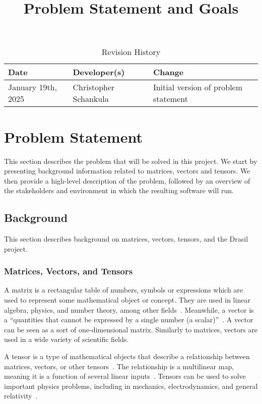 \documentclass{article}
\title{Problem Statement and Goals\\\progname}
\author{\authname}
\date{}
\begin{document}
\maketitle

\begin{table}[hp]
\caption{Revision History} \label{TblRevisionHistory}
\begin{tabularx}{\textwidth}{llX}
\toprule
\textbf{Date} & \textbf{Developer(s)} & \textbf{Change}\\
\midrule
January 19th, 2025 & Christopher Schankula & Initial version of problem statement\\
\bottomrule
\end{tabularx}
\end{table}

\section{Problem Statement}

This section describes the problem that will be solved in this project. We start by
presenting background information related to matrices, vectors and tensors. We then
provide a high-level description of the problem, followed by an overview of the
stakeholders and environment in which the resulting software will run.

\subsection{Background}

This section describes background on matrices, vectors, tensors, and the Drasil
project.

\subsubsection{Matrices, Vectors, and Tensors}

A matrix is a rectangular table of numbers, symbols or expressions which
are used to represent some mathematical object or concept. They are used in
linear algebra, physics, and number theory, among other 
fields~\cite{Wikipedia_Matrix_2025}. Meanwhile, a vector is a ``quantities that 
cannot be expressed by a single number (a scalar)''~\cite{Wikipedia_Vectors_2024}.
A vector can be seen as a sort of one-dimensional matrix. Similarly to matrices,
vectors are used in a wide variety of scientific fields.

A tensor is a type of mathematical objects that describe a relationship
between matrices, vectors, or other tensors~\cite{Wikipedia_Tensors_2025}. 
The relationship is a multilinear map, meaning it is a function of several 
linear inputs~\cite{Wikipedia_Multilinear_2024}. Tensors can be used to solve
important physics problems, including in mechanics, electrodynamics, and general
relativity~\cite{Wikipedia_Tensors_2025}.
\end{document}
